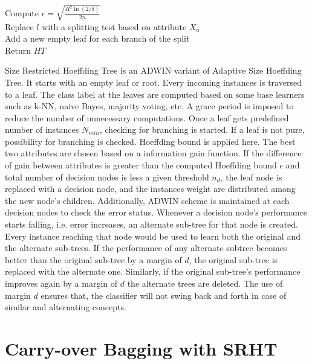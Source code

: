 \begin{algorithm}[htbp]
{{{{                    Compute $\epsilon = \sqrt{\frac{R^2 \ln(2/\delta)}{2n}}$   \\
                    
                     {
                         {
                            Replace $l$ with a splitting test based on attribute $X_a$ \\
                            Add a new empty leaf for each branch of the split \\
                        }
                    }
                }
            }
        }
    Return $HT$
    }
\end{algorithm}

Size Restricted Hoeffding Tree is an ADWIN variant of Adaptive Size Hoeffding Tree. It starts with an empty leaf or root. Every incoming instances is traversed to a leaf. The class label at the leaves are computed based on some base learners such as k-NN, naive Bayes, majority voting, etc. A grace period is imposed to reduce the number of unnecessary computations. Once a leaf gets predefined number of instances $N_{min}$, checking for branching is started. If a leaf is not pure, possibility for branching is checked. Hoeffding bound is applied here. The best two attributes  are chosen based on a information gain function. If the difference of gain between attributes is greater than the computed Hoeffding bound $\epsilon$ and total number of decision nodes is less a given threshold $n_d$, the leaf node is replaced with a decision node, and the instances weight are distributed among the new node's children. Additionally, ADWIN scheme is maintained at each decision nodes to check the error status. Whenever a decision node's performance starts falling, i.e. error increases, an alternate sub-tree for that node is created. Every instance reaching that node would be used to learn both the original and the alternate sub-trees. If the performance of any alternate subtree becomes better than the original sub-tree by a margin of $d$, the original sub-tree is replaced with the alternate one. Similarly, if the original sub-tree's performance improves again by a margin of $d$ the alternate trees are deleted. The use of margin $d$ ensures that, the classifier will not swing back and forth in case of similar and alternating concepts.

\section{Carry-over Bagging with SRHT}

